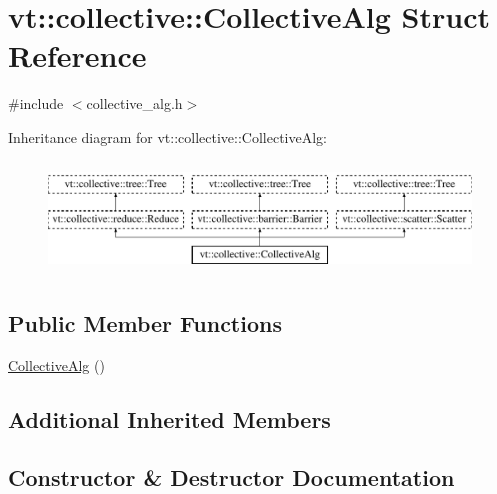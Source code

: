 \hypertarget{structvt_1_1collective_1_1_collective_alg}{}\section{vt\+:\+:collective\+:\+:Collective\+Alg Struct Reference}
\label{structvt_1_1collective_1_1_collective_alg}


{\ttfamily \#include $<$collective\+\_\+alg.\+h$>$}

Inheritance diagram for vt\+:\+:collective\+:\+:Collective\+Alg\+:\begin{figure}[H]
\begin{center}
\leavevmode
\includegraphics[height=3.000000cm]{structvt_1_1collective_1_1_collective_alg}
\end{center}
\end{figure}
\subsection*{Public Member Functions}
\begin{DoxyCompactItemize}
\item 
\hyperlink{structvt_1_1collective_1_1_collective_alg_aa137479fb6afcfa33e73592ea3cbbcd8}{Collective\+Alg} ()
\end{DoxyCompactItemize}
\subsection*{Additional Inherited Members}


\subsection{Constructor \& Destructor Documentation}
\mbox{\label{structvt_1_1collective_1_1_collective_alg_aa137479fb6afcfa33e73592ea3cbbcd8}} 
